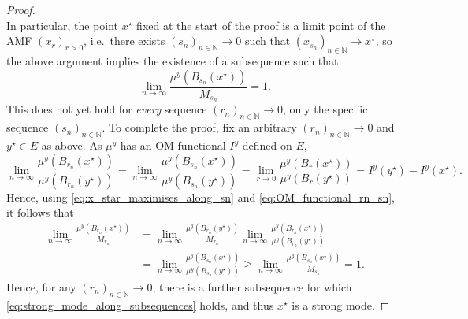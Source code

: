 \documentclass[11pt]{article}
\newcommand*{\cball}[2]{B_{#2}(#1)}
\newcommand*{\Naturals}{\mathbb{N}}
\renewcommand*{\geq}{\geqslant}
\theoremstyle{plain}
\theoremstyle{definition}
\numberwithin{equation}{section}
\numberwithin{figure}{section}
\numberwithin{table}{section}
\begin{document}
\begin{proof}
\begin{equation*}
	\end{equation*}
	In particular, the point $x^{\star}$ fixed at the start of the proof is a limit point of the AMF $(x_r)_{r > 0}$, i.e.\ there exists $(s_n)_{n \in \Naturals} \to 0$ such that $(x_{s_n})_{n \in \Naturals} \to x^{\star}$, so the above argument implies the existence of a subsequence such that
	\begin{equation} \label{eq:x_star_maximises_along_sn}
		\lim_{n \to \infty} \frac{\mu^y(\cball{x^{\star}}{s_n})}{M_{s_n}} = 1.
	\end{equation}
	This does not yet hold for \emph{every} sequence $(r_n)_{n \in \Naturals} \to 0$, only the specific sequence $(s_n)_{n \in \Naturals}$.
	To complete the proof, fix an arbitrary $(r_n)_{n \in \Naturals} \to 0$ and $y^{\star} \in E$ as above.
	As $\mu^y$ has an OM functional $I^y$ defined on $E$,
	\begin{equation} \label{eq:OM_functional_rn_sn}
		\lim_{n \to \infty} \frac{\mu^{y}(\cball{x^{\star}}{r_n})}{\mu^{y}(\cball{y^{\star}}{r_n})} = 
		\lim_{n \to \infty} \frac{\mu^{y}(\cball{x^{\star}}{s_n})}{\mu^{y}(\cball{y^{\star}}{s_n})} = 
		\lim_{r \to 0} \frac{\mu^y(\cball{x^{\star}}{r})}{\mu^y(\cball{y^{\star}}{r})} = I^y(y^{\star}) - I^y(x^{\star}).
	\end{equation}
	Hence, using \eqref{eq:x_star_maximises_along_sn} and \eqref{eq:OM_functional_rn_sn}, it follows that
	\begin{align*}
		\lim_{n \to \infty} \frac{\mu^{y}(\cball{x^{\star}}{r_n})}{M_{r_n}} 
		&= \lim_{n \to \infty} \frac{\mu^{y}(\cball{y^{\star}}{r_n})}{M_{r_n}} \lim_{n \to \infty} \frac{\mu^{y}(\cball{x^{\star}}{r_n})}{\mu^{y}(\cball{y^{\star}}{r_n})} \\
		&= \lim_{n \to \infty} \frac{\mu^{y}(\cball{x^{\star}}{s_n})}{\mu^{y}(\cball{y^{\star}}{s_n})}
		\geq \lim_{n \to \infty} \frac{\mu^{y}(\cball{x^{\star}}{s_n})}{M_{s_n}} = 1.
	\end{align*}
	Hence, for any $(r_n)_{n \in \Naturals} \to 0$, there is a further subsequence for which \eqref{eq:strong_mode_along_subsequences} holds, and thus $x^{\star}$ is a strong mode.
\end{proof}
\end{document}
